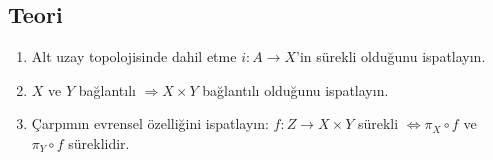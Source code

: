 \subsection*{Teori}

\begin{enumerate}[label=T\arabic*.]
\item Alt uzay topolojisinde dahil etme $i: A \to X$'in sürekli olduğunu ispatlayın.
\item $X$ ve $Y$ bağlantılı $\Rightarrow X \times Y$ bağlantılı olduğunu ispatlayın.
\item Çarpımın evrensel özelliğini ispatlayın: $f: Z \to X \times Y$ sürekli
      $\Leftrightarrow \pi_X \circ f$ ve $\pi_Y \circ f$ süreklidir.
\end{enumerate}
